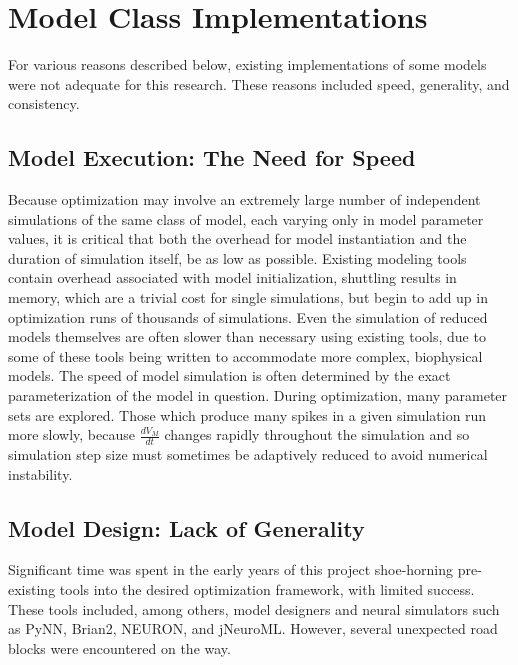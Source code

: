 \section{Model Class Implementations}
For various reasons described below, existing implementations of some models were not adequate for this research.
These reasons included speed, generality, and consistency.

\subsection{Model Execution: The Need for Speed}
Because optimization may involve an extremely large number of independent simulations of the same class of model, each varying only in model parameter values, it is critical that both the overhead for model instantiation and the duration of simulation itself, be as low as possible.
Existing modeling tools contain overhead associated with model initialization, shuttling results in memory, which are a trivial cost for single simulations, but begin to add up in optimization runs of thousands of simulations.  
Even the simulation of reduced models themselves are often slower than necessary using existing tools, due to some of these tools being written to accommodate more complex, biophysical models.
The speed of model simulation is often determined by the exact parameterization of the model in question.
During optimization, many parameter sets are explored. Those which produce many spikes in a given simulation run more slowly, because $\frac{dV_{M}}{dt}$ changes rapidly throughout the simulation and so simulation step size must sometimes be adaptively reduced to avoid numerical instability.

\subsection{Model Design: Lack of Generality}
Significant time was spent in the early years of this project shoe-horning pre-existing tools into the desired optimization framework, with limited success.
These tools included, among others, model designers and neural simulators such as PyNN, Brian2, NEURON, and jNeuroML.
However, several unexpected road blocks were encountered on the way.

